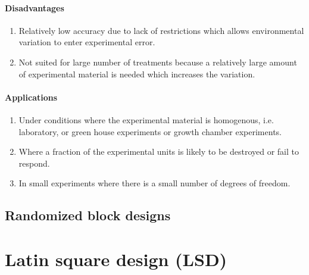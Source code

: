 \documentclass[oneside,11pt,pdftex]{book}%
\numberwithin{equation}{section}
\numberwithin{section}{chapter}
\numberwithin{equation}{chapter}
\begin{document}
\subsubsection{Disadvantages}
\begin{enumerate}
	\item Relatively low accuracy due to lack of restrictions which allows environmental variation to enter experimental error.
	\item Not suited for large number of treatments because a relatively large amount of experimental material is needed which increases the variation.
\end{enumerate}
\subsubsection{Applications}
\begin{enumerate}
	\item Under conditions where the experimental material is homogenous, i.e. laboratory, or green house experiments or growth chamber experiments.
	\item Where a fraction of the experimental units is likely to be destroyed or fail to respond.
	\item In small experiments where there is a small number of degrees of freedom.
\end{enumerate}

\section{Randomized block designs}






\chapter{Latin square design (LSD)}


\backmatter
\thispagestyle{empty}
\newpage
\end{document}
